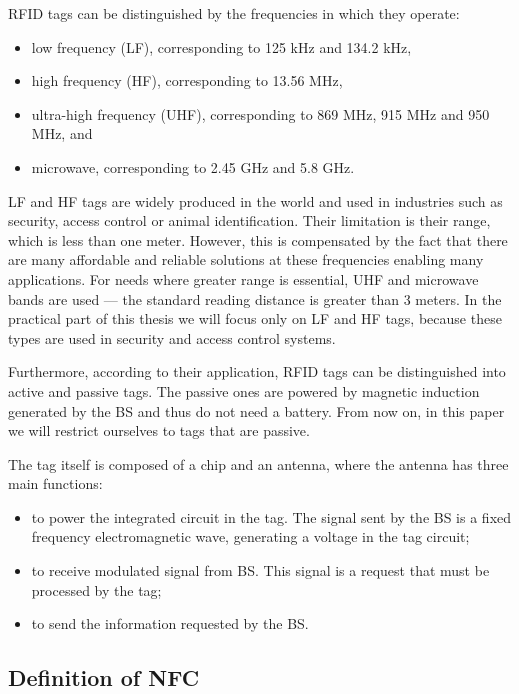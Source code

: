 RFID tags can be distinguished by the frequencies in which they operate:

\begin{itemize}
    \item low frequency (LF), corresponding to 125 kHz and 134.2 kHz,
    \item high frequency (HF), corresponding to 13.56 MHz, 
    \item ultra-high frequency (UHF), corresponding to 869 MHz, 915 MHz and 950 MHz, and
    \item microwave, corresponding to 2.45 GHz and 5.8 GHz.
\end{itemize}
LF and HF tags are widely produced in the world and used in industries such as security, access control or animal identification. Their limitation is their range, which is less than one meter. However, this is compensated by the fact that there are many affordable and reliable solutions at these frequencies enabling many applications. For needs where greater range is essential, UHF and microwave bands are used --- the standard reading distance is greater than 3 meters. In the practical part of this thesis we will focus only on LF and HF tags, because these types are used in security and access control systems.

Furthermore, according to their application, RFID tags can be distinguished into active and passive tags. The passive ones are powered by magnetic induction generated by the BS and thus do not need a battery. From now on, in this paper we will restrict ourselves to tags that are passive.


The tag itself is composed of a chip and an antenna, where the antenna has three main functions:

\begin{itemize}
    \item to power the integrated circuit in the tag. The signal sent by the BS is a fixed frequency electromagnetic wave, generating a voltage in the tag circuit;
    \item to receive modulated signal from BS. This signal is a request that must be processed by the tag;
    \item to send the information requested by the BS.
\end{itemize}

\subsection{Definition of NFC}

